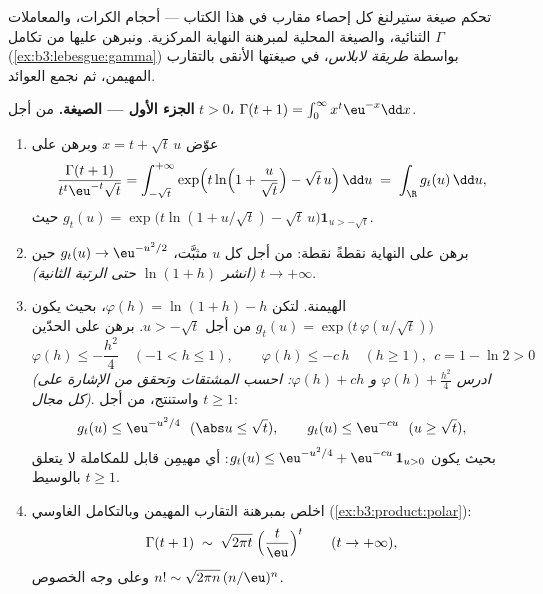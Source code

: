 \begin{problem}
\label{pb:b3:product:1}
تحكم صيغة ستيرلنغ كل إحصاء مقارب في هذا الكتاب --- أحجام
الكرات، والمعاملات الثنائية، والصيغة المحلية لمبرهنة النهاية
المركزية. ونبرهن عليها من تكامل $\Gamma$ (\cref{ex:b3:lebesgue:gamma})
بواسطة \emph{طريقة لابلاس}، في صيغتها الأنقى بالتقارب المهيمن، ثم
نجمع العوائد.

\medskip
\noindent\textbf{الجزء الأول --- الصيغة.} من أجل $t > 0$،
$\Gamma(t + 1) = \int_0^\infty x^{t}\eu^{-x}\dd x$.
\begin{enumerate}
  \item عوّض $x = t + \sqrt t\,u$ وبرهن على
        \[
        \frac{\Gamma(t+1)}{t^{t}\eu^{-t}\sqrt t}
        = \int_{-\sqrt t}^{+\infty}
        \exp\Bigl(t\ln\Bigl(1 + \frac u{\sqrt
        t}\Bigr) - \sqrt t\,u\Bigr)\,\dd u
        \;=\;\int_\R g_t(u)\,\dd u,
        \]
        حيث $g_t(u) = \exp\bigl(t\ln(1 + u/\sqrt t) -
        \sqrt t\,u\bigr)\mathbf 1_{u > -\sqrt t}$.
  \item برهن على النهاية نقطةً نقطة: من أجل كل $u$ مثبَّت،
        $g_t(u)
        \to \eu^{-u^2/2}$ حين $t \to +\infty$ \emph{(انشر $\ln(1 + h)$
        حتى الرتبة الثانية)}.
  \item الهيمنة. لتكن $\varphi(h) = \ln(1 + h) - h$، بحيث يكون $g_t(u) = \exp\bigl(t\,\varphi(u/\sqrt t)\bigr)$ من أجل
        $u > -\sqrt t$. برهن على الحدّين
        \[
        \varphi(h) \leq -\frac{h^2}4 \quad (-1 < h \leq 1),
        \qquad
        \varphi(h) \leq -c\,h \quad (h \geq 1),\ \ c = 1 -
        \ln 2 > 0
        \]
        \emph{(ادرس $\varphi(h) + \frac{h^2}4$ و $\varphi(h)
        + ch$: احسب المشتقات وتحقق من
        الإشارة على كل مجال)}. واستنتج، من أجل $t \geq 1$:
        \[
        g_t(u) \leq \eu^{-u^2/4}\ \ (\abs u \leq \sqrt t),
        \qquad
        g_t(u) \leq \eu^{-cu}\ \ (u \geq \sqrt t),
        \]
        بحيث يكون $g_t(u) \leq \eu^{-u^2/4} +
        \eu^{-cu}\,\mathbf 1_{u > 0}$: أي مهيمِن قابل للمكاملة لا يتعلق
        بالوسيط $t \geq 1$.
  \item اخلص بمبرهنة التقارب المهيمن وبالتكامل الغاوسي
        (\cref{ex:b3:product:polar}):
        \[
        \Gamma(t + 1) \;\sim\;
        \sqrt{2\pi t}\;\Bigl(\frac t\eu\Bigr)^{t}
        \qquad (t \to +\infty),
        \]
        وعلى وجه الخصوص $n! \sim \sqrt{2\pi
        n}\,(n/\eu)^n$.
\end{enumerate}


\end{problem}
